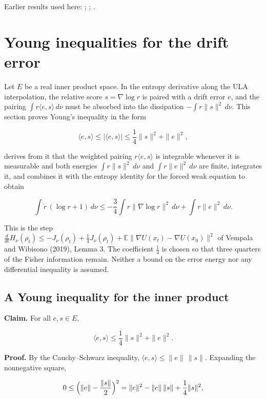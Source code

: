 \documentclass[11pt,a4paper]{report}
\begin{document}
Earlier results used here: \cite[Section~3.34.1]{LangevinLean2026ULASC}; \cite[Section~3.36.5]{LangevinLean2026ULASC}; \cite[Section~3.37.4]{LangevinLean2026ULASC}.
\section{\texorpdfstring{Young inequalities for the drift error}{Young inequalities for the drift error}}
\label{proof-module-UnadjustedLangevin-LSI-DriftError-lean}


Let \(E\) be a real inner product space. In the entropy derivative along the ULA interpolation, the relative score \(s=\nabla\log r\) is paired with a drift error \(e\), and the pairing \(\int r\langle e,s\rangle\,d\nu\) must be absorbed into the dissipation \(-\int r\|s\|^2\,d\nu\). This section proves Young's inequality in the form


\[\langle e,s\rangle\le|\langle e,s\rangle|\le\frac14\|s\|^2+\|e\|^2,\]


derives from it that the weighted pairing \(r\langle e,s\rangle\) is integrable whenever it is measurable and both energies \(\int r\|s\|^2\,d\nu\) and \(\int r\|e\|^2\,d\nu\) are finite, integrates it, and combines it with the entropy identity for the forced weak equation to obtain


\[\int\dot r\,(\log r+1)\,d\nu\le-\frac34\int r\|\nabla\log r\|^2\,d\nu+\int r\|e\|^2\,d\nu.\]


This is the step \(\frac{d}{dt}H_\nu(\rho_t)\le-J_\nu(\rho_t)+\frac14J_\nu(\rho_t)+\mathbb E\|\nabla U(x_t)-\nabla U(x_0)\|^2\) of Vempala and Wibisono (2019), Lemma 3. The coefficient \(\frac14\) is chosen so that three quarters of the Fisher information remain. Neither a bound on the error energy nor any differential inequality is assumed.

\subsection{\texorpdfstring{A Young inequality for the inner product}{A Young inequality for the inner product}}
\label{report-step-UnadjustedLangevin-LSI-DriftError-lean-1}


\textbf{Claim.} For all \(e,s\in E\),


\[\langle e,s\rangle\le\frac14\|s\|^2+\|e\|^2.\]


\textbf{Proof.} By the Cauchy–Schwarz inequality, \(\langle e,s\rangle\le\|e\|\,\|s\|\). Expanding the nonnegative square,


\[0\le\Bigl(\|e\|-\frac{\|s\|}2\Bigr)^2=\|e\|^2-\|e\|\,\|s\|+\frac14\|s\|^2,\]
\end{document}

